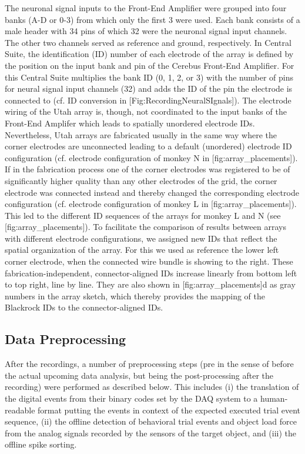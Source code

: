 {The neuronal signal inputs to the Front-End Amplifier were grouped into four banks (A-D or 0-3) from which only the first 3 were used. Each bank consists of a male header with 34 pins of which 32 were the neuronal signal input channels. The other two channels served as reference and ground, respectively. In Central Suite, the identification (ID) number of each electrode of the array is defined by the position on the input bank and pin of the Cerebus Front-End Amplifier. For this Central Suite multiplies the bank ID (0, 1, 2, or 3) with the number of pins for neural signal input channels (32) and adds the ID of the pin the electrode is connected to (cf. ID conversion in [Fig:RecordingNeuralSIgnals]). The electrode wiring of the Utah array is, though, not coordinated to the input banks of the Front-End Amplifer which leads to spatially unordered electrode IDs. Nevertheless, Utah arrays are fabricated usually in the same way where the corner electrodes are unconnected leading to a default (unordered) electrode ID configuration (cf. electrode configuration of monkey N in [fig:array\_placements]). If in the fabrication process one of the corner electrodes was registered to be of significantly higher quality than any other electrodes of the grid, the corner electrode was connected instead and thereby changed the corresponding electrode configuration (cf. electrode configuration of monkey L in [fig:array\_placements]). This led to the different ID sequences of the arrays for monkey L and N (see [fig:array\_placements]). To facilitate the comparison of results between arrays with different electrode configurations, we assigned new IDs that reflect the spatial organization of the array. For this we used as reference the lower left corner electrode, when the connected wire bundle is showing to the right. These fabrication-independent, connector-aligned IDs increase linearly from bottom left to top right, line by line. They are also shown in [fig:array\_placements]d as gray numbers in the array sketch, which thereby provides the mapping of the Blackrock IDs to the connector-aligned IDs. 





\subsection{Data Preprocessing}

After the recordings, a number of preprocessing steps (pre in the sense of before the actual upcoming data analysis, but being the post-processing after the recording) were performed as described below. This includes (i) the translation of the digital events from their binary codes set by the DAQ system to a human-readable format putting the events in context of the expected executed trial event sequence, (ii) the offline detection of behavioral trial events and object load force from the analog signals recorded by the sensors of the target object, and (iii) the offline spike sorting.

}
